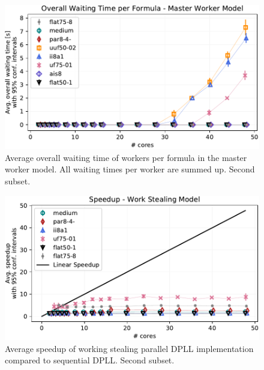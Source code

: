 \documentclass[letterpaper]{article}
\begin{document}
\begin{figure}[p]
    \centering
    \includegraphics[width=\columnwidth]{figures/waiting_parallel_non_subset_dpll_scaling_tar.pdf}
    \caption{Average overall waiting time of workers per formula in the master worker model.
    All waiting times per worker are summed up.
    Second subset.}
    \label{fig:dpll_parallel_waiting_non}
\end{figure}

\begin{figure}[p]
    \centering
    \includegraphics[width=\columnwidth]{figures/scaling_stealing_non_subset_dpll_scaling_tar.pdf}
    \caption{Average speedup of working stealing parallel DPLL implementation compared to sequential DPLL.
    Second subset.}
    \label{fig:dpll_stealing_speedup_non}
\end{figure}
\end{document}
